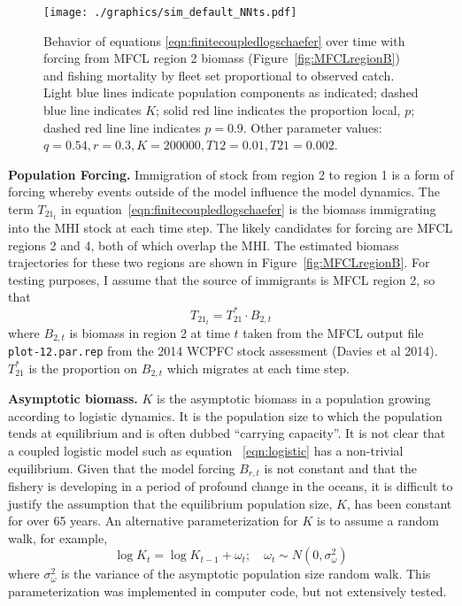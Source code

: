 \documentclass[12pt,letterpaper,twoside]{article}
\begin{document}
\begin{figure}
\begin{center}
\texttt{[image: ./graphics/sim\_default\_NNts.pdf]}
\caption{\label{fig:NNts}
Behavior of equations \ref{eqn:finitecoupledlogschaefer} over time with
forcing from MFCL region 2 biomass (Figure~\ref{fig:MFCLregionB}) and
fishing mortality by fleet set proportional to observed catch.
Light blue lines indicate population components as indicated; 
dashed blue line indicates $K$;
solid red line indicates the proportion local, $p$;  
dashed red line line indicates $p=0.9$.
Other parameter values: $q=0.54, r=0.3, K=200000, T12=0.01, T21=0.002$.
}
\end{center}
\end{figure}

{\bf Population Forcing.}
Immigration of stock from region 2 to region 1 is a
form of forcing whereby events outside of the model influence the
model dynamics. The term $T_{{21}_t}$ in 
equation~\ref{eqn:finitecoupledlogschaefer}
is the biomass immigrating
into the MHI stock at each time step. 
The likely candidates for forcing are MFCL regions 2 and 4, both of
which overlap the MHI. The estimated biomass trajectories for these
two regions are shown in Figure~\ref{fig:MFCLregionB}.
For testing purposes,
I assume that the source of immigrants is MFCL region 2, so that
\begin{equation}
T_{{21}_t} = T^*_{21}\cdot B_{2,t}
\end{equation}
where $B_{2,t}$ is biomass in region 2 at time $t$ taken from the MFCL output file
{\tt plot-12.par.rep} from the 2014 WCPFC stock assessment
(Davies et al 2014). $T^*_{21}$ is the proportion on
$B_{2,t}$ which migrates at each time step.

{\bf Asymptotic biomass.}
$K$ is the asymptotic biomass in a population growing according to
logistic dynamics. It is the population size to which the population
tends at equilibrium and is often dubbed ``carrying capacity''. 
It is not clear that a coupled logistic model such as equation~
\ref{eqn:logistic} has a non-trivial equilibrium. 
Given that the model forcing $B_{r,t}$ is not constant and that the
fishery is developing in a period of profound change in the oceans,
it is difficult to justify the assumption that the equilibrium
population size, $K$, has been constant for over 65 years. An
alternative parameterization for $K$ is to assume a random walk, for
example,
\begin{equation}
\log K_t = \log K_{t-1} + \omega_t;\quad \omega_t\sim
N(0,\sigma^2_\omega) \label{eqn:Kwalk}
\end{equation}
where  $\sigma^2_\omega$ is the variance of the
asymptotic population size random walk.
This parameterization was implemented in computer code, but not extensively
tested.
\end{document}
